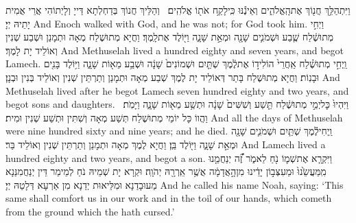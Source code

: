 {וַיִּתְהַלֵּ֥ךְ חֲנ֖וֹךְ אֶת\maqqaf הָֽאֱלֹהִ֑ים וְאֵינֶ֕נּוּ כִּֽי\maqqaf לָקַ֥ח אֹת֖וֹ אֱלֹהִֽים׃ \setuma }
{וְהַלֵּיךְ חֲנוֹךְ בְּדַחְלְתָא דַּייָ וְלָיְתוֹהִי אֲרֵי אֲמִית יָתֵיהּ יְיָ׃}
{And Enoch walked with God, and he was not; for God took him.}{}
{וַיְחִ֣י מְתוּשֶׁ֔לַח שֶׁ֧בַע וּשְׁמֹנִ֛ים שָׁנָ֖ה וּמְאַ֣ת שָׁנָ֑ה וַיּ֖וֹלֶד אֶת\maqqaf לָֽמֶךְ׃}
{וַחֲיָא מְתוּשֶׁלַח מְאָה וּתְמָנַן וּשְׁבַע שְׁנִין וְאוֹלֵיד יָת לָמֶךְ׃}
{And Methuselah lived a hundred eighty and seven years, and begot Lamech.}{}
{וַֽיְחִ֣י מְתוּשֶׁ֗לַח אַֽחֲרֵי֙ הוֹלִיד֣וֹ אֶת\maqqaf לֶ֔מֶךְ שְׁתַּ֤יִם וּשְׁמוֹנִים֙ שָׁנָ֔ה וּשְׁבַ֥ע מֵא֖וֹת שָׁנָ֑ה וַיּ֥וֹלֶד בָּנִ֖ים וּבָנֽוֹת׃}
{וַחֲיָא מְתוּשֶׁלַח בָּתַר דְּאוֹלֵיד יָת לֶמֶךְ שְׁבַע מְאָה וּתְמָנַן וְתַרְתֵּין שְׁנִין וְאוֹלֵיד בְּנִין וּבְנָן׃}
{And Methuselah lived after he begot Lamech seven hundred eighty and two years, and begot sons and daughters.}{}
{וַיִּהְיוּ֙ כׇּל\maqqaf יְמֵ֣י מְתוּשֶׁ֔לַח תֵּ֤שַׁע וְשִׁשִּׁים֙ שָׁנָ֔ה וּתְשַׁ֥ע מֵא֖וֹת שָׁנָ֑ה וַיָּמֹֽת׃ \setuma }
{וַהֲווֹ כָּל יוֹמֵי מְתוּשֶׁלַח תְּשַׁע מְאָה וְשִׁתִּין וּתְשַׁע שְׁנִין וּמִית׃}
{And all the days of Methuselah were nine hundred sixty and nine years; and he died.}{}
{וַֽיְחִי\maqqaf לֶ֕מֶךְ שְׁתַּ֧יִם וּשְׁמֹנִ֛ים שָׁנָ֖ה וּמְאַ֣ת שָׁנָ֑ה וַיּ֖וֹלֶד בֵּֽן׃}
{וַחֲיָא לֶמֶךְ מְאָה וּתְמָנַן וְתַרְתֵּין שְׁנִין וְאוֹלֵיד בַּר׃}
{And Lamech lived a hundred eighty and two years, and begot a son.}{}
{וַיִּקְרָ֧א אֶת\maqqaf שְׁמ֛וֹ נֹ֖חַ לֵאמֹ֑ר זֶ֞֠ה יְנַחֲמֵ֤נוּ מִֽמַּעֲשֵׂ֙נוּ֙ וּמֵעִצְּב֣וֹן יָדֵ֔ינוּ מִן\maqqaf הָ֣אֲדָמָ֔ה אֲשֶׁ֥ר אֵֽרְרָ֖הּ יְהֹוָֽה׃}
{וּקְרָא יָת שְׁמֵיהּ נֹחַ לְמֵימַר דֵּין יְנַחֲמִנַּנָא מֵעוּבָדַנָא וּמִלֵּיאוּת יְדַנָא מִן אַרְעָא דְּלָטַהּ יְיָ׃}
{And he called his name Noah, saying: ‘This same shall comfort us in our work and in the toil of our hands, which cometh from the ground which the \lord\space hath cursed.’}{}
